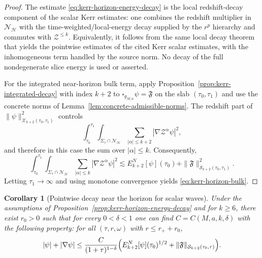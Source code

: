 \documentclass[11pt]{article}
\numberwithin{equation}{section}
\theoremstyle{plain}
\newtheorem{corollary}[theorem]{Corollary}
\theoremstyle{definition}
\theoremstyle{remark}
\begin{document}
\begin{proof}
The estimate \eqref{eq:kerr-horizon-energy-decay} is the local redshift-decay component of the scalar Kerr estimates: one combines the redshift multiplier in $\mathcal N_{\mathcal H}$ with the time-weighted/local-energy decay supplied by the $r^p$ hierarchy and commutes with $\mathcal Z^{\le k}$. Equivalently, it follows from the same local decay theorem that yields the pointwise estimates of the cited Kerr scalar estimates, with the inhomogeneous term handled by the source norm. No decay of the full nondegenerate slice energy is used or asserted.

For the integrated near-horizon bulk term, apply Proposition~\ref{prop:kerr-integrated-decay} with index $k+2$ to $\square_{g_{M,a}}\psi=\mathfrak{F}$ on the slab $(\tau_{0},\tau_{1})$ and use the concrete norms of Lemma~\ref{lem:concrete-admissible-norms}.
The redshift part of $\|\psi\|_{\mathcal X_{k+2}(\tau_{0},\tau_{1})}^{2}$ controls
\begin{equation}
\int_{\tau_{0}}^{\tau_{1}}\int_{\Sigma_{\tau}\cap\mathcal N_{\mathcal H}}\sum_{|\alpha|\le k+2}
|\nabla \mathcal Z^{\alpha}\psi|^{2},
\end{equation}
and therefore in this case the sum over $|\alpha|\le k$.
Consequently,
\begin{equation}
\int_{\tau_{0}}^{\tau_{1}}\int_{\Sigma_{\tau}\cap\mathcal N_{\mathcal H}}\sum_{|\alpha|\le k}
|\nabla \mathcal Z^{\alpha}\psi|^{2}
\lesssim
E^{N}_{k+2}[\psi](\tau_{0})
+
\|\mathfrak{F}\|_{\mathcal S_{k+2}(\tau_{0},\tau_{1})}^{2}.
\end{equation}
Letting $\tau_{1}\to\infty$ and using monotone convergence yields \eqref{eq:kerr-horizon-bulk}.
\end{proof}

\begin{corollary}[Pointwise decay near the horizon for scalar waves]\label{cor:kerr-horizon-pointwise-scalar}
Under the assumptions of Proposition~\ref*{prop:kerr-horizon-energy-decay} and for $k\ge6$, there exist $r_{0}>0$ such that for every $0<\delta<1$ one can find $C=C(M,a,k,\delta)$ with the following property: for all $(\tau,r,\omega)$ with $r\le r_{+}+r_{0}$,
\begin{equation}\label{eq:kerr-horizon-pointwise-scalar}
|\psi|+|\nabla\psi|
\le
\frac{C}{(1+\tau)^{1-\delta}}
\Bigl(
E^{N}_{k+2}[\psi](\tau_{0})^{1/2}
+
\|\mathfrak{F}\|_{\mathcal S_{k+2}(\tau_{0},\tau)}
\Bigr).
\end{equation}
\end{corollary}
\end{document}
